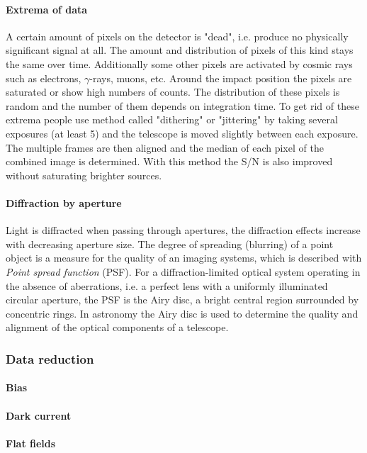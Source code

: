 \paragraph{Extrema of data}
A certain amount of pixels on the detector is "dead", i.e. produce no physically significant signal at all. The amount and distribution of pixels of this kind stays the same over time. Additionally some other pixels are activated by cosmic rays such as electrons, $\gamma$-rays, muons, etc. Around the impact position the pixels are saturated or show high numbers of counts. The distribution of these pixels is random and the number of them depends on integration time. To get rid of these extrema people use method called "dithering" or "jittering" by taking several exposures (at least 5) and the telescope is moved slightly between each exposure. The multiple frames are then aligned and the median of each pixel of the combined image is determined. With this method the S/N is also improved without saturating brighter sources.

\paragraph{Diffraction by aperture}
Light is diffracted when passing through apertures, the diffraction effects increase with decreasing aperture size. The degree of spreading (blurring) of a point object is a measure for the quality of an imaging systems, which is described with \textit{Point spread function} (PSF). For a diffraction-limited optical system operating in the absence of aberrations, i.e. a perfect lens with a uniformly illuminated circular aperture, the PSF is the Airy disc, a bright central region surrounded by concentric rings. In astronomy the Airy disc is used to determine the quality and alignment of the optical components of a telescope.

\subsubsection{Data reduction}
\paragraph{Bias}
\paragraph{Dark current}
\paragraph{Flat fields}
